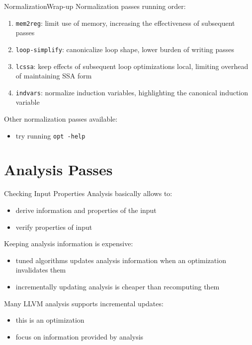 \documentclass[10pt,mathserif]{beamer}
\begin{document}
\begin{frame}{Normalization}{Wrap-up}
Normalization passes running order:

\begin{enumerate}
\item \texttt{mem2reg}: limit use of memory, increasing the effectiveness of
       subsequent passes
\item \texttt{loop-simplify}: canonicalize loop shape, lower burden of writing
      passes
\item \texttt{lcssa}: keep effects of subsequent loop optimizations local,
      limiting overhead of maintaining SSA form
\item \texttt{indvars}: normalize induction variables, highlighting the
      canonical induction variable
\end{enumerate}

\vfill
Other normalization passes available:

\begin{itemize}
\item try running \texttt{opt -help}
\end{itemize}
\end{frame}



\section{Analysis Passes}
\begin{frame}{Checking Input Properties}
Analysis basically allows to:
\begin{itemize}
\item \alert{derive} information and properties of the input
\item \alert{verify} properties of input
\end{itemize}

\vfill
Keeping analysis information is expensive:
\begin{itemize}
\item tuned algorithms updates analysis information when an optimization
      invalidates them
\item incrementally updating analysis is cheaper than recomputing them
\end{itemize}

\vfill
Many LLVM analysis supports incremental updates:
\begin{itemize}
\item this is an \alert{optimization}
\item focus on \alert{information} provided by analysis
\end{itemize}
\end{frame}
\end{document}
